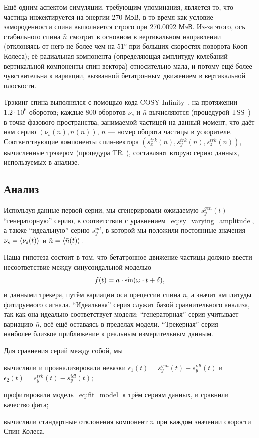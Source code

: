 Ещё одним аспектом симуляции, требующим упоминания, является то, что частица инжектируется на энергии 270 МэВ, в то время как условие замороденности спина выполняется строго при 270.0092 МэВ. Из-за этого, ось стабильного спина $\bar n$ смотрит в основном в вертикальном направлении (отклоняясь от него не более чем на \ang{51} при больших скоростях поворота Кооп-Колеса); её радиальная компонента (определяющая амплитуду колебаний вертикальной компоненты спин-вектора) относительно мала, и потому ещё более чувствительна к вариации, вызванной бетатронным движением в вертикальной плоскости.

Трэкинг спина выполнялся с помощью кода COSY Infinity~\cite{COSYINF:Website}, на протяжении $1.2\cdot10^6$
оборотов; каждые 800 оборотов $\nu_s$ и $\bar n$ вычисляются (процедурой
TSS~\cite[стр.~41]{COSYINF:Manual:BeamPhys}) в точке фазового пространства, занимаемой частицей на данный момент,
что даёт нам серию $(\nu_s(n), \bar n(n))$, $n$ --- номер оборота частицы в ускорителе.
Соответствующие компоненты спин-вектора $(s_x^{trk}(n), s_y^{trk}(n), s_z^{trk}(n))$,
вычисленные трэкером (процедура TR~\cite[p.~41]{COSYINF:Manual:BeamPhys}), составляют вторую серию данных,
используемых в анализе.

\subsection{Анализ}
Используя данные первой серии, мы сгенерировали ожидаемую $s_y^{gen}(t)$ ``генераторную'' серию,
в соответствии с уравнением~\eqref{eq:sy_varying_amplitude}, а также ``идеальную'' серию $s_y^{idl}$, в которой
мы положили постоянные значения $\nu_s = \avg{\nu_s(t)}$ и $\bar n =\avg{\bar n(t)}$. 

Наша гипотеза состоит в том, что бетатронное движение частицы
должно ввести несоответствие между синусоидальной моделью
\begin{equation}
  f(t) = a\cdot\sin(\omega\cdot t + \delta),\label{eq:fit_model}
\end{equation}
и данными трекера, путём вариации оси прецессии спина $\bar n$, а значит амплитуды
фитируемого сигнала. ``Идеальная'' серия служит базой сравнительного анализа,
так как она идеально соответствует модели; ``генераторная'' серия учитывает вариацию $\bar n$,
всё ещё оставаясь в пределах модели. ``Трекерная'' серия --- наиболее близкое приближение
к реальным измерительным данным.

Для сравнения серий между собой, мы
\begin{enumerate*}
\item вычислили и проанализировали невязки $\epsilon_1(t) = s_y^{gen}(t) -
  s_y^{idl}(t)$ и $\epsilon_2(t) = s_y^{trk}(t) - s_y^{idl}(t)$;
\item профитировали модель~\eqref{eq:fit_model} к трём сериям данных, и
  сравнили качество фита;
\item вычислили стандартные отклонения компонент $\bar n$ при каждом
  значении скорости Спин-Колеса.
\end{enumerate*}

